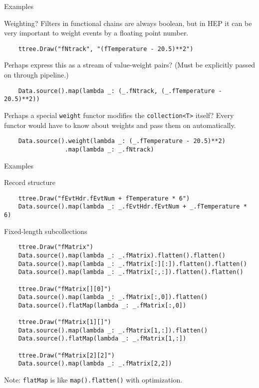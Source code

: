 \documentclass{beamer}
\begin{document}
\begin{frame}[fragile]{Examples}
\begin{block}{Weighting?}
Filters in functional chains are always boolean, but in HEP it can be very important to weight events by a floating point number.

{\scriptsize \begin{verbatim}
    ttree.Draw("fNtrack", "(fTemperature - 20.5)**2")
\end{verbatim}}

Perhaps express this as a stream of value-weight pairs? (Must be explicitly passed on through pipeline.)

{\scriptsize \begin{verbatim}
    Data.source().map(lambda _: (_.fNtrack, (_.fTemperature - 20.5)**2))
\end{verbatim}}

Perhaps a special {\tt weight} functor modifies the {\tt collection<T>} itself? Every functor would have to know about weights and pass them on automatically.

{\scriptsize \begin{verbatim}
    Data.source().weight(lambda _: (_.fTemperature - 20.5)**2)
                 .map(lambda _: _.fNtrack)
\end{verbatim}}
\end{block}
\end{frame}

\begin{frame}[fragile]{Examples}
\begin{block}{Record structure}
\vspace{-0.5\baselineskip}
{\scriptsize \begin{verbatim}
    ttree.Draw("fEvtHdr.fEvtNum + fTemperature * 6")
    Data.source().map(lambda _: _.fEvtHdr.fEvtNum + _.fTemperature * 6)
\end{verbatim}}
\vspace{-0.5\baselineskip}
\end{block}

\begin{block}{Fixed-length subcollections}
\vspace{-0.5\baselineskip}
{\scriptsize \begin{verbatim}
    ttree.Draw("fMatrix")
    Data.source().map(lambda _: _.fMatrix).flatten().flatten()
    Data.source().map(lambda _: _.fMatrix[:][:]).flatten().flatten()
    Data.source().map(lambda _: _.fMatrix[:,:]).flatten().flatten()

    ttree.Draw("fMatrix[][0]")
    Data.source().map(lambda _: _.fMatrix[:,0]).flatten()
    Data.source().flatMap(lambda _: _.fMatrix[:,0])

    ttree.Draw("fMatrix[1][]")
    Data.source().map(lambda _: _.fMatrix[1,:]).flatten()
    Data.source().flatMap(lambda _: _.fMatrix[1,:])

    ttree.Draw("fMatrix[2][2]")
    Data.source().map(lambda _: _.fMatrix[2,2])
\end{verbatim}}
\vspace{-0.5\baselineskip}
Note: {\tt flatMap} is like {\tt map().flatten()} with optimization.
\end{block}
\end{frame}
\end{document}
